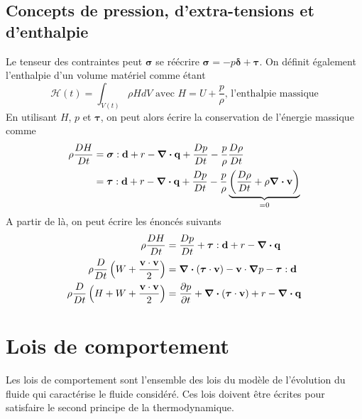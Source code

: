 \documentclass[a4paper,11pt]{report}
\newcommand{\dvm}[2]{\frac{D #1}{D #2}}
\begin{document}
      \subsection{Concepts de pression, d'extra-tensions et d'enthalpie}
        Le tenseur des contraintes peut $\boldsymbol{\sigma}$ se réécrire $\boldsymbol{\sigma} = -p \boldsymbol{\delta} + \boldsymbol{\tau}$. On définit également l'enthalpie d'un volume matériel comme étant
        \begin{equation}
          \mathcal{H}(t) = \int_{V(t)} \rho H dV \textrm{ avec } H = U + \frac{p}{\rho}\textrm{, l'enthalpie massique}
        \end{equation}
        En utilisant $H$, $p$ et $\boldsymbol{\tau}$, on peut alors écrire la conservation de l'énergie massique comme
        \begin{align}
          \rho \dvm{H}{t} &= \boldsymbol{\sigma} : \vb{d} + r - \div \vb{q} +  \dvm{p}{t} - \frac{p}{\rho}\dvm{\rho}{t}\nonumber\\
          &= \boldsymbol{\tau} : \vb{d} + r - \div \vb{q} + \dvm{p}{t} - \frac{p}{\rho} \underbrace{\left(\dvm{\rho}{t} + \rho \div \vb{v} \right)}_{=0}
        \end{align}
        A partir de là, on peut écrire les énoncés suivants
        \begin{gather}\begin{aligned}
          \rho \dvm{H}{t} &= \dvm{p}{t} + \boldsymbol{\tau} : \vb{d} + r - \div \vb{q}\\
          \rho \dvm{}{t}\left(W + \frac{\vb{v}\cdot\vb{v}}{2}\right) &= \div (\boldsymbol{\tau} \cdot \vb{v}) - \vb{v} \cdot \grad p - \boldsymbol{\tau} : \vb{d} \\
          \rho \dvm{}{t}\left(H + W + \frac{\vb{v}\cdot\vb{v}}{2}\right) &= \pdv{p}{t} + \div (\boldsymbol{\tau} \cdot \vb{v}) + r - \div \vb{q}
        \end{aligned}\end{gather}

    \section{Lois de comportement}
      Les lois de comportement sont l'ensemble des lois du modèle de l'évolution du fluide qui caractérise le fluide considéré. Ces lois doivent être écrites pour satisfaire le second principe de la thermodynamique.
\end{document}
